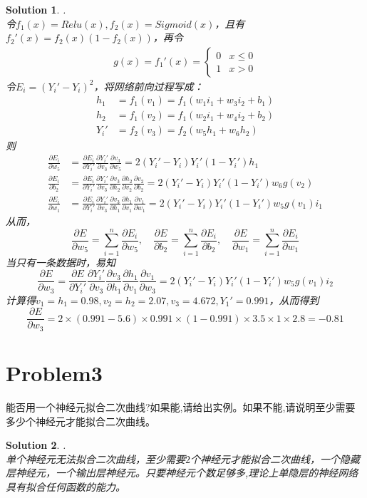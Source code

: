 \documentclass[a4paper,UTF8]{article}
\numberwithin{equation}{section}
\newtheorem*{solution}{Solution}
\begin{document}
\begin{solution}.\\
	令$f_1(x)=Relu(x),f_2(x)=Sigmoid(x)$，且有$f_2'(x)=f_2(x)(1-f_2(x))$，再令
	\begin{align*}
		g(x)=f_1'(x)=\begin{cases}
			0& x\leq0\\
			1& x>0
		\end{cases}
	\end{align*}
	令$E_i=(Y_i'-Y_i)^2$，将网络前向过程写成：
	\begin{align*}
		h_1&=f_1(v_1)=f_1(w_1i_1+w_3i_2+b_1)\\
		h_2&=f_1(v_2)=f_1(w_2i_1+w_4i_2+b_2)\\
		Y_i'&=f_2(v_3)=f_2(w_5h_1+w_6h_2)
	\end{align*}
    则\begin{align*}
    	\frac{\partial E_i}{\partial w_5}&=\frac{\partial E_i}{\partial Y_i'}\frac{\partial Y_i'}{\partial v_3}\frac{\partial v_3}{\partial w_5}=2(Y_i'-Y_i)Y_i'(1-Y_i')h_1\\
    	\frac{\partial E_i}{\partial b_2}&=\frac{\partial E_i}{\partial Y_i'}\frac{\partial Y_i'}{\partial v_3}\frac{\partial v_3}{\partial h_2}\frac{\partial h_2}{\partial v_2}\frac{\partial v_2}{\partial b_2}=2(Y_i'-Y_i)Y_i'(1-Y_i')w_6g(v_2)\\
    	\frac{\partial E_i}{\partial w_1}&=\frac{\partial E_i}{\partial Y_i'}\frac{\partial Y_i'}{\partial v_3}\frac{\partial v_3}{\partial h_1}\frac{\partial h_1}{\partial v_1}\frac{\partial v_1}{\partial w_1}=2(Y_i'-Y_i)Y_i'(1-Y_i')w_5g(v_1)i_1
    \end{align*}
    从而，$$\frac{\partial E}{\partial w_5}=\sum_{i=1}^{n}\frac{\partial E_i}{\partial w_5},\quad\frac{\partial E}{\partial b_2}=\sum_{i=1}^{n}\frac{\partial E_i}{\partial b_2},\quad\frac{\partial E}{\partial w_1}=\sum_{i=1}^{n}\frac{\partial E_i}{\partial w_1}$$
    当只有一条数据时，易知$$\frac{\partial E}{\partial w_3}=\frac{\partial E}{\partial Y_i'}\frac{\partial Y_i'}{\partial v_3}\frac{\partial v_3}{\partial h_1}\frac{\partial h_1}{\partial v_1}\frac{\partial v_1}{\partial w_3}=2(Y_i'-Y_i)Y_i'(1-Y_i')w_5g(v_1)i_2$$
    计算得$v_1=h_1=0.98,v_2=h_2=2.07,v_3=4.672,Y_1'=0.991$，从而得到$$\frac{\partial E}{\partial w_3}=2\times(0.991-5.6)\times0.991\times(1-0.991)\times3.5\times1\times2.8=-0.81$$
\end{solution}
\section*{Problem3}
能否用一个神经元拟合二次曲线?如果能,请给出实例。如果不能,请说明至少需要多少个神经元才能拟合二次曲线。
\begin{solution}.\\
	单个神经元无法拟合二次曲线，至少需要$2$个神经元才能拟合二次曲线，一个隐藏层神经元，一个输出层神经元。只要神经元个数足够多,理论上单隐层的神经网络具有拟合任何函数的能力。
\end{solution}
\end{document}
